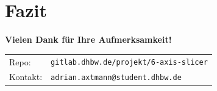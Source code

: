\section{Fazit}

\begin{frame}
    \centering
    \vspace{1cm}
    \Large \textbf{Vielen Dank für Ihre Aufmerksamkeit!}
    
    \vspace{1cm}
    \normalsize
    
    \vspace{1.5cm}
    \footnotesize
    \begin{tabular}{ll}
        Repo: & \texttt{gitlab.dhbw.de/projekt/6-axis-slicer} \\
        Kontakt: & \texttt{adrian.axtmann@student.dhbw.de}
    \end{tabular}
\end{frame}
